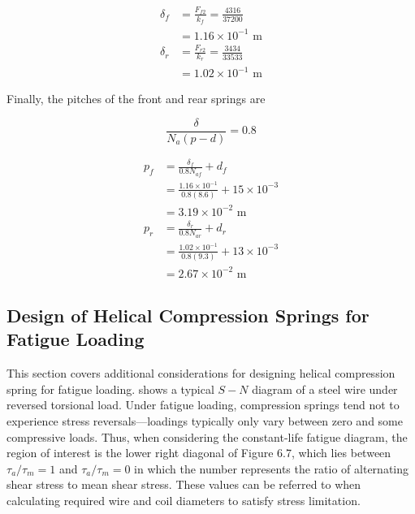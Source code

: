 \documentclass[
10pt,
a4paper,
openany,
svgnames,
]{book}
\begin{document}
\begin{solution}
  \begin{align*}
    \delta_f &= \frac{F_{f2}}{k_f} = \frac{4316}{37200} \\
             &= 1.16 \times 10^{-1} \text{ m} \\
    \delta_r &= \frac{F_{r2}}{k_r} = \frac{3434}{33533} \\
             &= 1.02 \times 10^{-1} \text{ m}
  \end{align*}
  
  Finally, the pitches of the front and rear springs are

    \[\frac{\delta}{N_a(p - d)} = 0.8\]

  \begin{align*}
    p_f &= \frac{\delta_f}{0.8N_{af}} + d_f \\ 
          &= \frac{1.16 \times 10^{-1}}{0.8(8.6)} + 15 \times 10^{-3} \\ 
          &= 3.19 \times 10^{-2} \text{ m} \\
    p_r &= \frac{\delta_r}{0.8N_{ar}} + d_r \\ 
          &= \frac{1.02 \times 10^{-1}}{0.8(9.3)} + 13 \times 10^{-3} \\ 
          &= 2.67 \times 10^{-2} \text{ m}
  \end{align*}
\end{solution}

\subsection{Design of Helical Compression Springs for Fatigue Loading}

This section covers additional considerations for designing helical compression spring for fatigue loading.  shows a typical $S-N$ diagram of a steel wire under reversed torsional load. Under fatigue loading, compression springs tend not to experience stress reversals—loadings typically only vary between zero and some compressive loads. Thus, when considering the constant-life fatigue diagram, the region of interest is the lower right diagonal of Figure 6.7, which lies between $\tau_a / \tau_m = 1$ and $\tau_a / \tau_m = 0$ in which the number represents the ratio of alternating shear stress to mean shear stress. These values can be referred to when calculating required wire and coil diameters to satisfy stress limitation.
\end{document}
